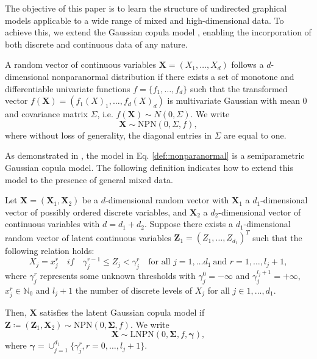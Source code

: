 The objective of this paper is to learn the structure of undirected graphical models applicable to a wide range of mixed and high-dimensional data. To achieve this, we extend the Gaussian copula model \citep{Liu09, Liu12, Xue12}, enabling the incorporation of both discrete and continuous data of any nature.

\begin{definition}
    A random vector of continuous variables \(\mathbf{X} = (X_1, \dots, X_d)\) follows a $d$-dimensional nonparanormal distribution if there exists a set of monotone and differentiable univariate functions $f = \{f_1,\dots, f_d\}$ such that the transformed vector \(f(\mathbf{X}) = (f_1(X)_1, \dots, f_d(X)_d)\) is multivariate Gaussian with mean $0$ and covariance matrix \(\Sigma\), i.e. \(f(\mathbf{X})\sim N(0,\Sigma)\). We write
    \begin{equation}\label{def::nonparanormal}
        \mathbf{X} \sim \text{NPN}(0, \Sigma, f),
    \end{equation}
    where without loss of generality, the diagonal entries in \(\Sigma\) are equal to one.
\end{definition}

As demonstrated in \cite{Liu09}, the model in Eq. \eqref{def::nonparanormal} is a semiparametric Gaussian copula model. The following definition indicates how to extend this model to the presence of general mixed data.

\begin{definition}\label{latent_gaussian_cm}
    Let $\mathbf{X} = (\mathbf{X}_1,\mathbf{X}_2)$ be a $d$-dimensional random vector with \(\mathbf{X}_1\) a $d_1$-dimensional vector of possibly ordered discrete variables, and \(\mathbf{X}_2\) a $d_2$-dimensional vector of continuous variables with \(d = d_1 + d_2\). Suppose there exists a $d_1$-dimensional random vector of latent continuous variables $\mathbf{Z}_1 = (Z_1, \dots, Z_{d_1})^T$ such that the following relation holds:
    \begin{equation}\label{latent_ordered}
        X_j = x_j^{r} \quad if \quad \gamma_j^{r-1} \leq Z_j < \gamma_j^r \quad \text{for all } j = 1, \dots d_1 \ \text{and } r = 1, \dots, l_j+1,
    \end{equation}
    where $\gamma^r_j$ represents some unknown thresholds with $\gamma_j^0 = -\infty$ and $\gamma_j^{l_j +1} = +\infty$, $x^r_j \in \mathbb{N}_0$ and $l_{j} +1$ the number of discrete levels of $X_j$ for all $j \in 1, \dots, d_1$.

    Then, $\mathbf{X}$ satisfies the latent Gaussian copula model if $\mathbf{Z} \coloneqq (\mathbf{Z}_1, \mathbf{X}_2) \sim \text{NPN}(0, \mathbf{\Sigma}, f)$. We write
    \begin{equation}
        \mathbf{X} \sim \text{LNPN}(0, \mathbf{\Sigma}, f, \mathbf{\gamma}),
    \end{equation}
    where $\mathbf{\gamma} = \cup_{j=1}^{d_1} \{\gamma_j^r, r = 0, \dots, l_j+1\}$.
\end{definition}

